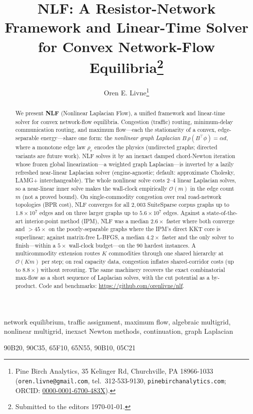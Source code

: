 \documentclass{siamart220329}
\title{NLF: A Resistor-Network Framework and Linear-Time Solver for Convex Network-Flow Equilibria\thanks{Submitted to the editors \today.}}
\author{Oren E. Livne\thanks{Pine Birch Analytics, 35 Kelinger Rd, Churchville, PA 18966-1033 (\texttt{oren.livne@gmail.com}, tel.\ 312-533-9130, \texttt{pinebirchanalytics.com}; ORCID: \href{https://orcid.org/0000-0001-6700-483X}{0000-0001-6700-483X}).}}
\begin{document}
\maketitle

\begin{abstract}
We present \textbf{NLF} (Nonlinear Laplacian Flow), a unified framework and linear-time solver for
convex network-flow equilibria. Congestion (traffic) routing, minimum-delay communication
routing, and maximum flow---each the stationarity of a convex, edge-separable energy---share one
form: the \emph{nonlinear graph Laplacian} $B\,\rho(B^{\top}\phi)=\alpha d$, where a monotone
edge law $\rho_e$ encodes the physics (undirected graphs; directed variants are future work).
NLF solves it by an inexact damped chord-Newton iteration whose frozen global
linearization---a weighted graph Laplacian---is inverted by a lazily refreshed near-linear
Laplacian solver (engine-agnostic; default: approximate Cholesky, LAMG+ interchangeable).
The whole nonlinear solve costs $2$--$4$ linear Laplacian solves, so a near-linear inner solve makes
the wall-clock empirically $\mathcal{O}(m)$ in the edge count $m$ (not a proved
bound). On single-commodity congestion over real road-network topologies (BPR cost), NLF converges for
all $2{,}003$ SuiteSparse corpus graphs up to $1.8\times10^7$ edges and on three larger graphs up to
$5.6\times10^7$ edges. Against a state-of-the-art interior-point method (IPM), NLF was a median
$2.6\times$ faster where both converge and $>45\times$ on the poorly-separable graphs where the IPM's
direct KKT core is superlinear; against matrix-free L-BFGS, a median $4.2\times$ faster and the only
solver to finish---within a $5\times$ wall-clock budget---on the $90$ hardest instances. A multicommodity extension routes $K$
commodities through one shared hierarchy at $\mathcal{O}(Km)$ per step; on real capacity data,
congestion inflates shared-corridor costs (up to $8.8\times$) without rerouting. The same
machinery recovers the exact combinatorial max-flow as a short sequence of Laplacian solves, with
the cut potential as a by-product. Code and benchmarks: \url{https://github.com/orenlivne/nlf}.
\end{abstract}

\begin{keywords}
network equilibrium, traffic assignment, maximum flow, algebraic
multigrid, nonlinear multigrid, inexact Newton methods, continuation, graph Laplacian
\end{keywords}

\begin{AMS}
90B20, 90C35, 65F10, 65N55, 90B10, 05C21
\end{AMS}
\end{document}
